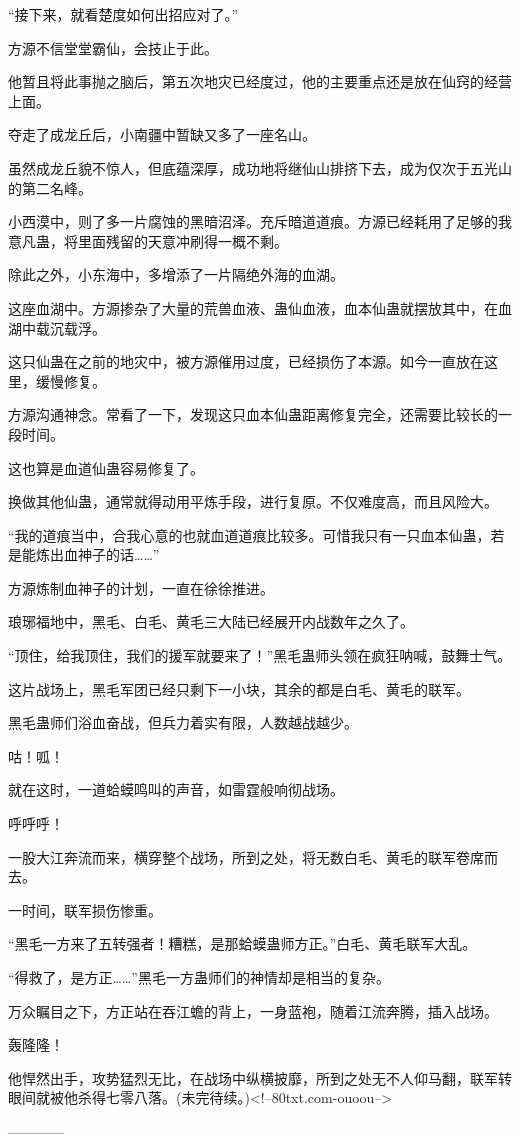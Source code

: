 \begin{this_body}
“接下来，就看楚度如何出招应对了。”

方源不信堂堂霸仙，会技止于此。

他暂且将此事抛之脑后，第五次地灾已经度过，他的主要重点还是放在仙窍的经营上面。

夺走了成龙丘后，小南疆中暂缺又多了一座名山。

虽然成龙丘貌不惊人，但底蕴深厚，成功地将继仙山排挤下去，成为仅次于五光山的第二名峰。

小西漠中，则了多一片腐蚀的黑暗沼泽。充斥暗道道痕。方源已经耗用了足够的我意凡蛊，将里面残留的天意冲刷得一概不剩。

除此之外，小东海中，多增添了一片隔绝外海的血湖。

这座血湖中。方源掺杂了大量的荒兽血液、蛊仙血液，血本仙蛊就摆放其中，在血湖中载沉载浮。

这只仙蛊在之前的地灾中，被方源催用过度，已经损伤了本源。如今一直放在这里，缓慢修复。

方源沟通神念。常看了一下，发现这只血本仙蛊距离修复完全，还需要比较长的一段时间。

这也算是血道仙蛊容易修复了。

换做其他仙蛊，通常就得动用平炼手段，进行复原。不仅难度高，而且风险大。

“我的道痕当中，合我心意的也就血道道痕比较多。可惜我只有一只血本仙蛊，若是能炼出血神子的话……”

方源炼制血神子的计划，一直在徐徐推进。

琅琊福地中，黑毛、白毛、黄毛三大陆已经展开内战数年之久了。

“顶住，给我顶住，我们的援军就要来了！”黑毛蛊师头领在疯狂呐喊，鼓舞士气。

这片战场上，黑毛军团已经只剩下一小块，其余的都是白毛、黄毛的联军。

黑毛蛊师们浴血奋战，但兵力着实有限，人数越战越少。

咕！呱！

就在这时，一道蛤蟆鸣叫的声音，如雷霆般响彻战场。

呼呼呼！

一股大江奔流而来，横穿整个战场，所到之处，将无数白毛、黄毛的联军卷席而去。

一时间，联军损伤惨重。

“黑毛一方来了五转强者！糟糕，是那蛤蟆蛊师方正。”白毛、黄毛联军大乱。

“得救了，是方正……”黑毛一方蛊师们的神情却是相当的复杂。

万众瞩目之下，方正站在吞江蟾的背上，一身蓝袍，随着江流奔腾，插入战场。

轰隆隆！

他悍然出手，攻势猛烈无比，在战场中纵横披靡，所到之处无不人仰马翻，联军转眼间就被他杀得七零八落。(未完待续。)<!--80txt.com-ouoou-->

------------

\end{this_body}

